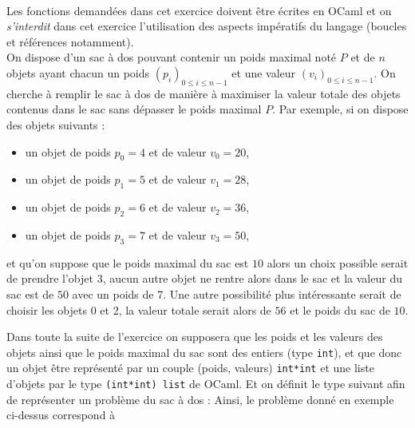 \documentclass[11pt,a4paper]{article}
\begin{document}
\begin{Exercise}[title = {Implémentation d'un tableau associatif}, origin = {\bac \; {\sc ccmp 2025}, {\sc mpi} } ]
\end{Exercise}


\begin{Exercise}[title={Problème du sac à dos}]\\
	Les fonctions demandées dans cet exercice doivent être écrites en OCaml et on \textit{s'interdit} dans cet exercice l'utilisation des aspects impératifs du langage (boucles et références notamment).\\
	On dispose d'un sac à dos pouvant contenir un poids maximal noté $P$ et de $n$ objets ayant chacun un poids $\left(p_i\right)_{0\leqslant i \leqslant n-1}$ et une valeur $\left(v_i\right)_{0\leqslant i \leqslant n-1}$. On cherche à remplir le sac à dos de manière à maximiser la valeur totale des objets contenus dans le sac sans dépasser le poids maximal $P$.
	Par exemple, si on dispose des objets suivants :
	\begin{itemize}
		\item un objet de poids $p_0 = 4$ et de valeur $v_0 = 20$,
		\item un objet de poids $p_1 = 5$ et de valeur $v_1 = 28$,
		\item un objet de poids $p_2 = 6$ et de valeur $v_2 = 36$,
		\item un objet de poids $p_3 = 7$ et de valeur $v_3 = 50$,
	\end{itemize}
	et qu'on suppose que le poids maximal du sac est $10$ alors un choix possible serait de prendre l'objet 3, aucun autre objet ne rentre alors dans le sac et la valeur du sac est  de $50$ avec un poids de 7. Une autre possibilité plus intéressante serait de choisir les objets 0  et 2, la valeur totale serait alors de $56$ et le poids du sac de $10$.\smallskip

	Dans toute la suite de l'exercice on supposera que les poids et les valeurs des objets ainsi que le poids maximal du sac sont des entiers (type {\tt int}), et que donc un objet  être représenté par un couple (poids, valeurs) {\tt int*int} et une liste d'objets par le type {\tt (int*int) list} de OCaml. Et on définit le type suivant afin de représenter un problème du sac à dos :
	Ainsi, le problème donné en exemple ci-dessus correspond à



\end{Exercise}
\end{document}
